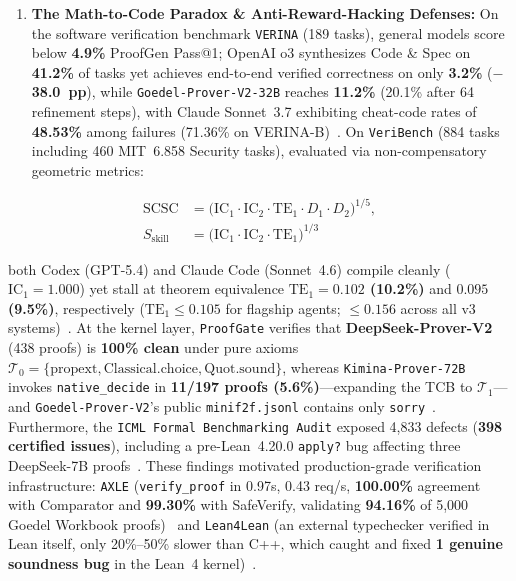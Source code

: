 \documentclass[10pt,twocolumn]{article}
\begin{document}
\begin{enumerate}
  \item \textbf{The Math-to-Code Paradox \& Anti-Reward-Hacking Defenses:} On the software verification benchmark \texttt{VERINA} (189 tasks), general models score below \textbf{4.9\%} ProofGen Pass@1; OpenAI o3 synthesizes Code \& Spec on \textbf{41.2\%} of tasks yet achieves end-to-end verified correctness on only \textbf{3.2\%} (\textbf{$-$38.0~pp}), while \texttt{Goedel-Prover-V2-32B} reaches \textbf{11.2\%} (20.1\% after 64 refinement steps), with Claude Sonnet~3.7 exhibiting cheat-code rates of \textbf{48.53\%} among failures (71.36\% on VERINA-B)~\cite{ye2026verina}. On \texttt{VeriBench} (884 tasks including 460 MIT~6.858 Security tasks), evaluated via non-compensatory geometric metrics:
\end{enumerate}

\begin{align}
  \mathrm{SCSC} &= \bigl(\mathrm{IC}_1 \cdot \mathrm{IC}_2 \cdot \mathrm{TE}_1 \cdot D_1 \cdot D_2\bigr)^{1/5}, \nonumber \\
  S_{\mathrm{skill}} &= \bigl(\mathrm{IC}_1 \cdot \mathrm{IC}_2 \cdot \mathrm{TE}_1\bigr)^{1/3}
  \label{eq:scsc}
\end{align}

\noindent both Codex (GPT-5.4) and Claude Code (Sonnet~4.6) compile cleanly ($\mathrm{IC}_1 = 1.000$) yet stall at theorem equivalence \textbf{$\mathrm{TE}_1 = 0.102$ (10.2\%)} and \textbf{$0.095$ (9.5\%)}, respectively (\textbf{$\mathrm{TE}_1 \le 0.105$} for flagship agents; $\le 0.156$ across all v3 systems)~\cite{miranda2026veribench}. At the kernel layer, \texttt{ProofGate} verifies that \textbf{DeepSeek-Prover-V2} (438 proofs) is \textbf{100\% clean} under pure axioms $\mathcal{T}_0 = \{\mathrm{propext}, \mathrm{Classical.choice}, \mathrm{Quot.sound}\}$, whereas \texttt{Kimina-Prover-72B} invokes \texttt{native\_decide} in \textbf{11/197 proofs (5.6\%)}---expanding the TCB to $\mathcal{T}_1$---and \texttt{Goedel-Prover-V2}'s public \texttt{minif2f.jsonl} contains only \texttt{sorry}~\cite{yang2026proofgate}. Furthermore, the \texttt{ICML Formal Benchmarking Audit} exposed 4,833 defects (\textbf{398 certified issues}), including a pre-Lean~4.20.0 \texttt{apply?} bug affecting three DeepSeek-7B proofs~\cite{ammanamanchi2026faults}. These findings motivated production-grade verification infrastructure: \texttt{AXLE} (\texttt{verify\_proof} in 0.97s, 0.43 req/s, \textbf{100.00\%} agreement with Comparator and \textbf{99.30\%} with SafeVerify, validating \textbf{94.16\%} of 5,000 Goedel Workbook proofs)~\cite{xin2026axle} and \texttt{Lean4Lean} (an external typechecker verified in Lean itself, only 20\%--50\% slower than C++, which caught and fixed \textbf{1 genuine soundness bug} in the Lean~4 kernel)~\cite{carneiro2025lean4lean}.
\end{document}
